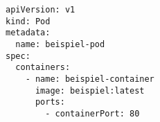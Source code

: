 \begin{verbatim}
apiVersion: v1
kind: Pod
metadata:
  name: beispiel-pod
spec:
  containers:
    - name: beispiel-container
      image: beispiel:latest
      ports:
        - containerPort: 80
\end{verbatim}